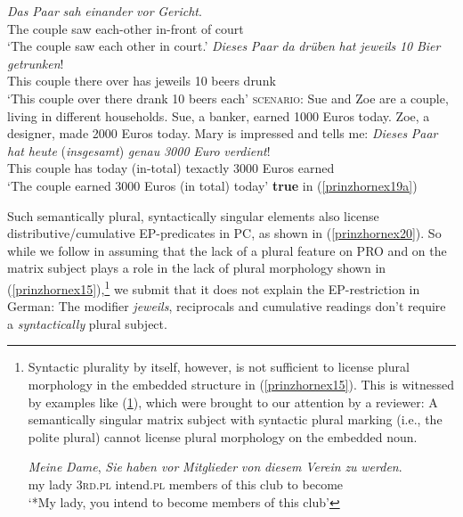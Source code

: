 \documentclass[output=paper,colorlinks,citecolor=brown,
]{langscibook}
\begin{document}
\ea \label{prinzhornex18} 
\ea 
\gll \textit{Das} \textit{Paar} \textit{sah} \textit{einander} \textit{vor} \textit{Gericht}.\\
  The couple saw each-other in-front of  court \\
\glt `The couple saw each other in court.' \label{prinzhornex18a}
\ex   \gll \textit{Dieses} \textit{Paar} \textit{da} \textit{dr\"{u}ben} \textit{hat} \textit{jeweils} \textit{10} \textit{Bier} \textit{getrunken}! \\
  This couple there over has jeweils 10 beers drunk\\
\glt `This couple over there drank 10 beers each'  \label{prinzhornex18b}
\ex  \textsc{scenario:} Sue and Zoe are a couple, living in different households. Sue, a banker, earned 1000 Euros today. Zoe, a designer, made 2000 Euros today. Mary is impressed and tells me: \label{prinzhornex19a}
\ex \gll \textit{Dieses} \textit{Paar} \textit{hat} \textit{heute} (\textit{insgesamt}) \textit{genau} \textit{3000} \textit{Euro} \textit{verdient}!\\
This couple has today (in-total) texactly 3000 Euros earned \\
\glt `The couple earned 3000 Euros (in total) today' \label{prinzhornex19b}\phantom{.}\hfill \textbf{true} in (\ref{prinzhornex19a})
\z\z

Such semantically plural, syntactically singular elements also license distributive/cumulative EP-predicates in PC, as shown in (\ref{prinzhornex20}). So while we follow \cite{Landau:2000} in assuming that the lack of a plural feature on PRO and  on the matrix subject plays a role in the lack of plural morphology shown in (\ref{prinzhornex15}),\footnote{Syntactic plurality by itself, however, is not sufficient to license plural morphology in the embedded structure in (\ref{prinzhornex15}). This is witnessed by examples like (\ref{prinzhorndame}), which were brought to our attention by a reviewer: A  semantically singular matrix subject with syntactic plural marking (i.e., the polite plural) cannot license plural morphology on the embedded noun.


\ea	 \gll  *\textit{Meine} \textit{Dame}, \textit{Sie} \textit{haben vor} \textit{Mitglieder} \textit{von} \textit{diesem} \textit{Verein} \textit{zu} \textit{werden}.\\
   my lady \textsc{3rd}.\textsc{pl}  intend.\textsc{pl} members of this club to become \\
\glt  `*My lady, you intend to become members of this club'\label{prinzhorndame}
\z

} we submit that it does not explain the EP-restriction in German: The modifier {\it jeweils}, reciprocals and cumulative readings don't require a \textit{syntactically} plural subject.
\end{document}
